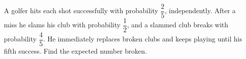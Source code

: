 A golfer hits each shot successfully with probability $\dfrac{2}{5}$, independently. After a miss he slams his club with probability $\dfrac{1}{2}$, and a slammed club breaks with probability $\dfrac{4}{5}$. He immediately replaces broken clubs and keeps playing until his fifth success. Find the expected number broken.
